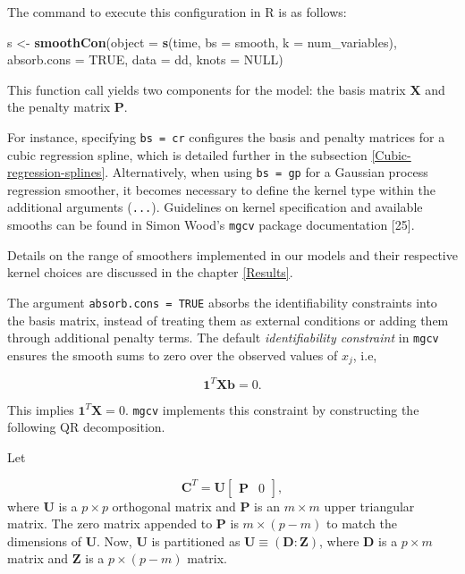 \documentclass[
11pt, %
oneside, %
english, %
singlespacing, %
]{macthesis} %
\newenvironment{Shaded}{\begin{snugshade}}{\end{snugshade}}
\newcommand{\AttributeTok}[1]{\textcolor[rgb]{0.13,0.29,0.53}{#1}}
\newcommand{\ConstantTok}[1]{\textcolor[rgb]{0.56,0.35,0.01}{#1}}
\newcommand{\FunctionTok}[1]{\textcolor[rgb]{0.13,0.29,0.53}{\textbf{#1}}}
\newcommand{\NormalTok}[1]{#1}
\newcommand{\OtherTok}[1]{\textcolor[rgb]{0.56,0.35,0.01}{#1}}
\begin{document}
The command to execute this configuration in R is as follows:

\begin{Shaded}
\begin{Highlighting}[]
\NormalTok{    s }\OtherTok{\textless{}{-}} \FunctionTok{smoothCon}\NormalTok{(}\AttributeTok{object =} \FunctionTok{s}\NormalTok{(time, }\AttributeTok{bs =}\NormalTok{ smooth, }\AttributeTok{k =}\NormalTok{ num\_variables),}
                   \AttributeTok{absorb.cons =} \ConstantTok{TRUE}\NormalTok{, }\AttributeTok{data =}\NormalTok{ dd, }\AttributeTok{knots =} \ConstantTok{NULL}\NormalTok{)}
\end{Highlighting}
\end{Shaded}

This function call yields two components for the model: the basis matrix \(\mathbf{X}\) and the penalty matrix \(\mathbf{P}\).

For instance, specifying \texttt{bs\ =\ cr} configures the basis and penalty matrices for a cubic regression spline, which is detailed further in the subsection \ref{Cubic-regression-splines}. Alternatively, when using \texttt{bs\ =\ gp} for a Gaussian process regression smoother, it becomes necessary to define the kernel type within the additional arguments (\texttt{...}). Guidelines on kernel specification and available smooths can be found in Simon Wood's \texttt{mgcv} package documentation {[}25{]}.

Details on the range of smoothers implemented in our models and their respective kernel choices are discussed in the chapter \ref{Results}.

The argument \texttt{absorb.cons\ =\ TRUE} absorbs the identifiability constraints into the basis matrix, instead of treating them as external conditions or adding them through additional penalty terms. The default \emph{identifiability constraint} in \texttt{mgcv} ensures the smooth sums to zero over the observed values of \(x_j\), i.e,

\[
\mathbf{1}^T\mathbf{X}\mathbf{b} = 0.
\]

This implies \(\mathbf{1}^T\mathbf{X} = 0\). \texttt{mgcv} implements this constraint by constructing the following QR decomposition.

Let

\[ 
\mathbf{C}^T = \mathbf{U} \begin{bmatrix} \mathbf{P} & 0 \end{bmatrix}, 
\]
where \(\mathbf{U}\) is a \(p \times p\) orthogonal matrix and \(\mathbf{P}\) is an \(m \times m\) upper triangular matrix. The zero matrix appended to \(\mathbf{P}\) is \(m \times (p-m)\) to match the dimensions of \(\mathbf{U}\). Now, \(\mathbf{U}\) is partitioned as \(\mathbf{U} \equiv (\mathbf{D} : \mathbf{Z})\), where \(\mathbf{D}\) is a \(p \times m\) matrix and \(\mathbf{Z}\) is a \(p \times (p-m)\) matrix.
\end{document}
